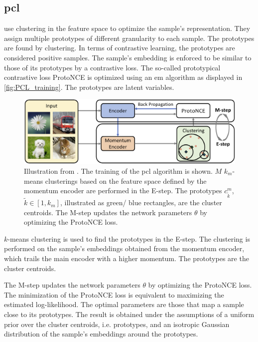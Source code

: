 \subsection{\acl{pcl}}\label{subsec:PCL}

\citet{li_prototypical_2021} use clustering in the feature space to optimize the sample's representation.
They assign multiple prototypes of different granularity to each sample.
The prototypes are found by clustering.
In terms of contrastive learning, the prototypes are considered positive samples.
The sample's embedding is enforced to be similar to those of its prototypes by a contrastive loss.
The so-called prototypical contrastive loss ProtoNCE is optimized using an \ac{em} algorithm 
as displayed in \autoref{fig:PCL_training}.
The prototypes are latent variables.

\begin{figure}[h] %
    \centering
    \includegraphics[width=360pt]{images/PCL_training.png}
    \caption{Illustration from \citet{li_prototypical_2021}.
    The training of the \ac{pcl} algorithm is shown.
    $M$ $k_m$-means clusterings based on the feature space defined by the momentum encoder 
    are performed in the E-step.
    The prototypes $c^m_{\tilde{k}}$, $\tilde{k} \in [1, k_m]$, illustrated as green/ blue rectangles, 
    are the cluster centroids.
    The M-step updates the network parameters $\theta$ by optimizing the ProtoNCE loss.
    }
    \label{fig:PCL_training}
\end{figure}

$k$-means clustering is used to find the prototypes in the E-step.
The clustering is performed on the sample's embeddings obtained from the momentum encoder, 
which trails the main encoder with a higher momentum.
The prototypes are the cluster centroids.

The M-step updates the network parameters $\theta$ by optimizing the ProtoNCE loss.
The minimization of the ProtoNCE loss is equivalent to maximizing the estimated log-likelihood.
The optimal parameters are those that map a sample close to its prototypes.
The result is obtained under the assumptions of a uniform prior over the cluster centroids, i.e. prototypes,
and an isotropic Gaussian distribution of the sample's embeddings around the prototypes.

